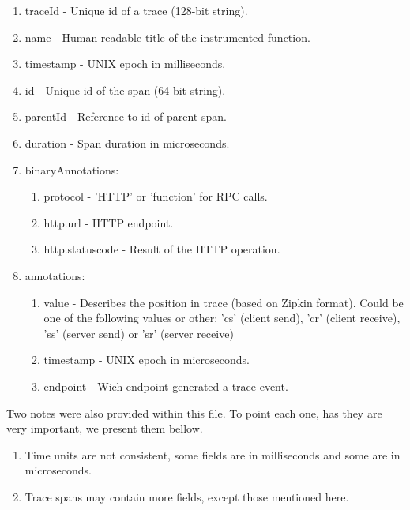 \begin{enumerate}[topsep=1pt, partopsep=1pt, itemsep=5pt, parsep=5pt]
    \item traceId - Unique id of a trace (128-bit string).
    \item name - Human-readable title of the instrumented function.
    \item timestamp - UNIX epoch in milliseconds.
    \item id - Unique id of the span (64-bit string).
    \item parentId - Reference to id of parent span.
    \item duration - Span duration in microseconds.
    \item binaryAnnotations:
    \begin{enumerate}[topsep=1pt, partopsep=1pt, itemsep=5pt, parsep=5pt]
        \item protocol - 'HTTP' or 'function' for RPC calls.
        \item http.url - HTTP endpoint.
        \item http.status\textunderscore code - Result of the HTTP operation. 
    \end{enumerate}
    \item annotations:
    \begin{enumerate}[topsep=1pt, partopsep=1pt, itemsep=5pt, parsep=5pt]
        \item value - Describes the position in trace (based on Zipkin format). Could be one of the following values or other: 'cs' (client send), 'cr' (client receive), 'ss' (server send) or 'sr' (server receive)
        \item timestamp - UNIX epoch in microseconds.
        \item endpoint - Wich endpoint generated a trace event.
    \end{enumerate}
\end{enumerate}

Two notes were also provided within this file. To point each one, has they are very important, we present them bellow.

\begin{enumerate}[topsep=1pt, partopsep=1pt, itemsep=5pt, parsep=5pt]
    \item Time units are not consistent, some fields are in milliseconds and some are in microseconds.
    \item Trace spans may contain more fields, except those mentioned here.
\end{enumerate}

